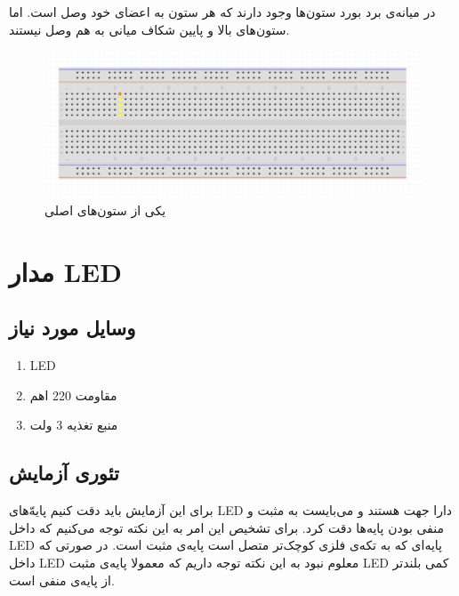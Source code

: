 در میانه‌ی برد بورد
ستون‌ها وجود دارند که هر ستون به اعضای خود وصل است.
اما ستون‌های بالا و پایین شکاف میانی به هم وصل نیستند.

\begin{figure}[h!]
\centering
\includegraphics[scale=0.3]{introduction/2.png}    
\caption{یکی از ستون‌های اصلی}
\end{figure}

\section{
مدار LED
}
\subsection*{وسایل مورد نیاز}
\begin{enumerate}
    \item LED
    \item مقاومت 220 اهم
    \item منبع تغذیه 3 ولت
\end{enumerate}

\subsection*{تئوری آزمایش}
برای این آزمایش باید دقت کنیم پایه‌ّهای
LED
دارا جهت هستند و می‌بایست به مثبت و منفی بودن پایه‌ها دقت کرد.
برای تشخیص این امر به این نکته توجه می‌کنیم که داخل
LED
پایه‌ای که به تکه‌ی فلزی کوچک‌تر متصل است پایه‌ی مثبت است.
در صورتی که داخل LED
معلوم نبود به این نکته توجه داریم که معمولا پایه‌ی مثبت
LED
کمی بلند‌تر از پایه‌ی منفی است.


